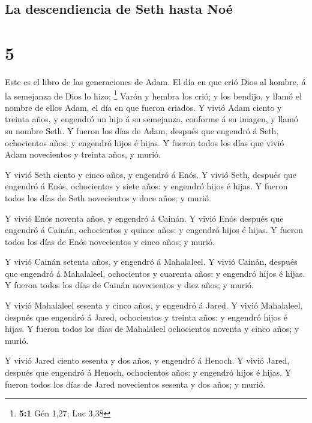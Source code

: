 \hypertarget{la-descendiencia-de-seth-hasta-nouxe9}{%
\subsection{La descendiencia de Seth hasta
Noé}\label{la-descendiencia-de-seth-hasta-nouxe9}}

\hypertarget{section-4}{%
\section{5}\label{section-4}}

 Este es el libro de las generaciones de Adam. El día en
que crió Dios al hombre, á la semejanza de Dios lo hizo; \footnote{\textbf{5:1}
  Gén 1,27; Luc 3,38}  Varón y hembra los crió; y los
bendijo, y llamó el nombre de ellos Adam, el día en que fueron criados.
 Y vivió Adam ciento y treinta años, y engendró un hijo á
su semejanza, conforme á su imagen, y llamó su nombre Seth.
 Y fueron los días de Adam, después que engendró á Seth,
ochocientos años: y engendró hijos é hijas.  Y fueron
todos los días que vivió Adam novecientos y treinta años, y murió.

 Y vivió Seth ciento y cinco años, y engendró á Enós.
 Y vivió Seth, después que engendró á Enós, ochocientos y
siete años: y engendró hijos é hijas.  Y fueron todos los
días de Seth novecientos y doce años; y murió.

 Y vivió Enós noventa años, y engendró á Cainán.
 Y vivió Enós después que engendró á Cainán, ochocientos
y quince años: y engendró hijos é hijas.  Y fueron todos
los días de Enós novecientos y cinco años; y murió.

 Y vivió Cainán setenta años, y engendró á Mahalaleel.
 Y vivió Cainán, después que engendró á Mahalaleel,
ochocientos y cuarenta años: y engendró hijos é hijas.  Y
fueron todos los días de Cainán novecientos y diez años; y murió.

 Y vivió Mahalaleel sesenta y cinco años, y engendró á
Jared.  Y vivió Mahalaleel, después que engendró á Jared,
ochocientos y treinta años: y engendró hijos é hijas.  Y
fueron todos los días de Mahalaleel ochocientos noventa y cinco años; y
murió.

 Y vivió Jared ciento sesenta y dos años, y engendró á
Henoch.  Y vivió Jared, después que engendró á Henoch,
ochocientos años: y engendró hijos é hijas.  Y fueron
todos los días de Jared novecientos sesenta y dos años; y murió.

